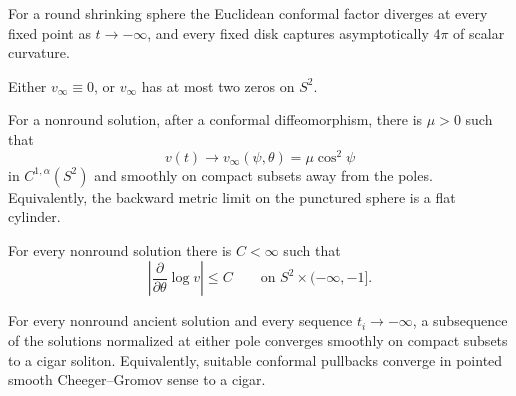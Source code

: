 \begin{remark}
\label{rem:chow-iv-round-sphere-curvature-concentration}
For a round shrinking sphere the Euclidean conformal factor diverges at every
fixed point as \(t\to-\infty\), and every fixed disk captures asymptotically
\(4\pi\) of scalar curvature.
\end{remark}

\begin{lemma}
\label{lem:chow-iv-backward-pressure-at-most-two-zeros}
Either \(v_\infty\equiv0\), or \(v_\infty\) has at most two zeros on \(S^2\).
\end{lemma}

\begin{proposition}
\label{prop:chow-iv-backward-pressure-cylinder}
For a nonround solution, after a conformal diffeomorphism, there is \(\mu>0\)
such that
\[
 v(t)\longrightarrow v_\infty(\psi,\theta)=\mu\cos^2\psi
\]
in \(C^{1,\alpha}(S^2)\) and smoothly on compact subsets away from the poles.
Equivalently, the backward metric limit on the punctured sphere is a flat
cylinder.
\end{proposition}

\begin{corollary}
\label{cor:chow-iv-angular-pressure-gradient-bound}
For every nonround solution there is \(C<\infty\) such that
\[
 \left|\frac{\partial}{\partial\theta}\log v\right|\le C
 \qquad\text{on }S^2\times(-\infty,-1].
\]
\end{corollary}

\begin{proposition}
\label{prop:chow-iv-poles-converge-to-cigars}
For every nonround ancient solution and every sequence \(t_i\to-\infty\), a
subsequence of the solutions normalized at either pole converges smoothly on
compact subsets to a cigar soliton.  Equivalently, suitable conformal
pullbacks converge in pointed smooth Cheeger--Gromov sense to a cigar.
\end{proposition}

